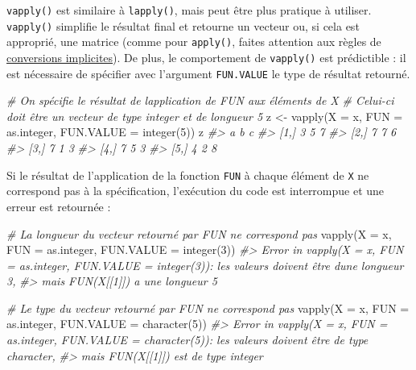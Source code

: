 \documentclass[
  french,
]{scrbook}
\newenvironment{Shaded}{\begin{snugshade}}{\end{snugshade}}
\newcommand{\AttributeTok}[1]{\textcolor[rgb]{0.77,0.63,0.00}{#1}}
\newcommand{\CommentTok}[1]{\textcolor[rgb]{0.56,0.35,0.01}{\textit{#1}}}
\newcommand{\DecValTok}[1]{\textcolor[rgb]{0.00,0.00,0.81}{#1}}
\newcommand{\FunctionTok}[1]{\textcolor[rgb]{0.00,0.00,0.00}{#1}}
\newcommand{\NormalTok}[1]{#1}
\newcommand{\OtherTok}[1]{\textcolor[rgb]{0.56,0.35,0.01}{#1}}
\begin{document}
\texttt{vapply()} est similaire à \texttt{lapply()}, mais peut être plus pratique à utiliser. \texttt{vapply()} simplifie le résultat final et retourne un vecteur ou, si cela est approprié, une matrice (comme pour \texttt{apply()}, faites attention aux règles de \protect\hyperlink{conversion}{conversions implicites}). De plus, le comportement de \texttt{vapply()} est prédictible : il est nécessaire de spécifier avec l'argument \texttt{FUN.VALUE} le type de résultat retourné.

\begin{Shaded}
\begin{Highlighting}[]
\CommentTok{\# On spécifie le résultat de l\textquotesingle{}application de FUN aux éléments de X}
\CommentTok{\# Celui{-}ci doit être un vecteur de type integer et de longueur 5}
\NormalTok{z }\OtherTok{\textless{}{-}} \FunctionTok{vapply}\NormalTok{(}\AttributeTok{X =}\NormalTok{ x, }\AttributeTok{FUN =}\NormalTok{ as.integer, }\AttributeTok{FUN.VALUE =} \FunctionTok{integer}\NormalTok{(}\DecValTok{5}\NormalTok{))}
\NormalTok{z}
\CommentTok{\#\textgreater{}      a b c}
\CommentTok{\#\textgreater{} [1,] 3 5 7}
\CommentTok{\#\textgreater{} [2,] 7 7 6}
\CommentTok{\#\textgreater{} [3,] 7 1 3}
\CommentTok{\#\textgreater{} [4,] 7 5 3}
\CommentTok{\#\textgreater{} [5,] 4 2 8}
\end{Highlighting}
\end{Shaded}

Si le résultat de l'application de la fonction \texttt{FUN} à chaque élément de \texttt{X} ne correspond pas à la spécification, l'exécution du code est interrompue et une erreur est retournée :

\begin{Shaded}
\begin{Highlighting}[]
\CommentTok{\# La longueur du vecteur retourné par FUN ne correspond pas}
\FunctionTok{vapply}\NormalTok{(}\AttributeTok{X =}\NormalTok{ x, }\AttributeTok{FUN =}\NormalTok{ as.integer, }\AttributeTok{FUN.VALUE =} \FunctionTok{integer}\NormalTok{(}\DecValTok{3}\NormalTok{))}
\CommentTok{\#\textgreater{} Error in vapply(X = x, FUN = as.integer, FUN.VALUE = integer(3)): les valeurs doivent être d\textquotesingle{}une longueur 3,}
\CommentTok{\#\textgreater{}  mais FUN(X[[1]]) a une longueur 5}

\CommentTok{\# Le type du vecteur retourné par FUN ne correspond pas}
\FunctionTok{vapply}\NormalTok{(}\AttributeTok{X =}\NormalTok{ x, }\AttributeTok{FUN =}\NormalTok{ as.integer, }\AttributeTok{FUN.VALUE =} \FunctionTok{character}\NormalTok{(}\DecValTok{5}\NormalTok{))}
\CommentTok{\#\textgreater{} Error in vapply(X = x, FUN = as.integer, FUN.VALUE = character(5)): les valeurs doivent être de type \textquotesingle{}character\textquotesingle{},}
\CommentTok{\#\textgreater{}  mais FUN(X[[1]]) est de type \textquotesingle{}integer\textquotesingle{}}
\end{Highlighting}
\end{Shaded}
\end{document}
